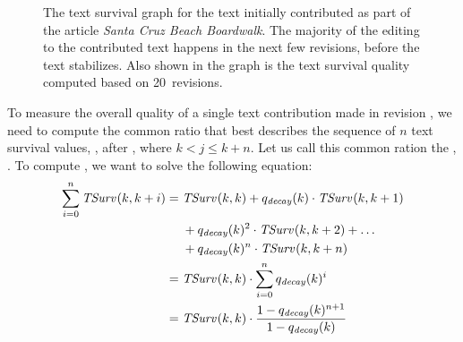 \begin{figure}[tbph]
\centering
{}
\caption{The text survival graph for the text initially contributed
	as part of the article \textit{Santa Cruz Beach Boardwalk}.
	The majority of the editing to the contributed text happens
	in the next few revisions, before the text stabilizes.
	Also shown in the graph is the text survival quality
	computed based on 20~revisions.
	}
\label{fig:ts-SantaCruzBeachBoardwalk}
\end{figure}

To measure the overall quality of a single text contribution
made in revision , we need to compute the common ratio
that best describes the sequence of $n$ text survival values,
, after , where $k < j \le k+n$.
Let us call this common ration the , .
To compute , we want to solve the following equation:
\begin{align*}
    \sum_{i=0}^n \mathit{TSurv}_{}(k,k+i) = {} & \mathit{TSurv}_{}(k,k) + q_\mathit{decay}(k) \cdot \mathit{TSurv}_{}(k,k+1) \\
    & + q_\mathit{decay}(k)^2 \cdot \mathit{TSurv}_{}(k,k+2) + \ldots \\
    & + q_\mathit{decay}(k)^n \cdot \mathit{TSurv}_{}(k,k+n) \\
    = {} & \mathit{TSurv}_{}(k,k) \cdot \sum_{i=0}^n q_\mathit{decay}(k)^i \\
    = {} & \mathit{TSurv}_{}(k,k) \cdot \frac{1 - q_\mathit{decay}(k)^{n+1}}{1 - q_\mathit{decay}(k)} \\
\end{align*}

